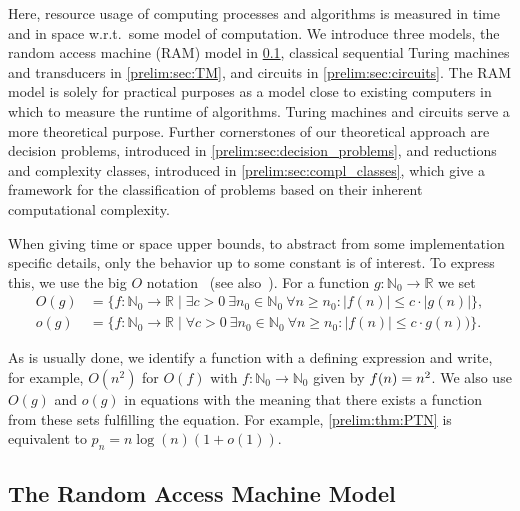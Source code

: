 
Here, resource usage of computing processes and algorithms
is measured in time and in space w.r.t.~some model of computation.
We introduce three models, the random access machine (RAM) model in \cref{prelim:sec:RAM},
classical sequential Turing machines and transducers in \cref{prelim:sec:TM}, and circuits in \cref{prelim:sec:circuits}.
The RAM model is solely for practical purposes as a model close
to existing computers in which to measure the runtime of algorithms.
Turing machines and circuits serve a more theoretical purpose.
Further cornerstones of our theoretical approach are decision problems, introduced
in \cref{prelim:sec:decision_problems}, and reductions and complexity classes, 
introduced in \cref{prelim:sec:compl_classes},
which give a framework for the classification of problems based on their inherent computational complexity.
 
When giving time or space upper bounds, to abstract from some implementation specific details, only the behavior up to some constant is of interest. To express this, we use the big $O$ notation~\cite{bachmann1894analytische} (see also~\cite{knuth76bigomicron}).
For a function $g \colon \mathbb N_0 \to \mathbb R$ \label{def:bigO}
we set
\begin{align*} \label{def:littleO}
	O(g) & = \{ f \colon \mathbb N_0 \to \mathbb R \mid \exists c > 0 \ \exists n_0 \in \mathbb N_0 \  \forall n \ge n_0 : |f(n)| \le c \cdot |g(n)| \}, \\
	o(g) & = \{ f \colon \mathbb N_0 \to \mathbb R \mid \forall c > 0 \  \exists n_0 \in \mathbb N_0 \ \forall n \ge n_0 : |f(n)| \le c\cdot g(n))\}.
\end{align*}

As is usually done, we identify
a function with a defining expression and write, for example, $O(n^2)$ 
for %
$O(f)$ with $f \colon \mathbb N_0 \to \mathbb N_0$ given by $\applyfunc{n}{f} = n^2$.
We also use $O(g)$ and $o(g)$ in equations with the meaning
that there exists a function from these sets fulfilling the equation.
For example, \cref{prelim:thm:PTN}
is equivalent to $p_n = n\log(n)(1 + o(1))$.

\subsection{The Random Access Machine Model}
\label{prelim:sec:RAM} 

